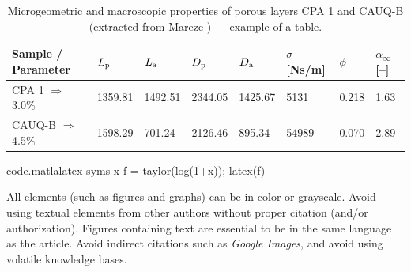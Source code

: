 \begin{table}[!htb]
  \centering {} 
  \caption{Microgeometric and macroscopic properties of porous layers CPA 1 and CAUQ-B\\ (extracted from Mareze \etal \cite{Mareze-2017}) --- example of a table.}
	\fontsize{11}{12}\selectfont 
    \begin{tabular}{C{2.9cm} | C{1.5cm} | C{1.5cm} | C{1.5cm} | C{1.5cm} | C{1.5cm} | C{1.0cm}| C{1.0cm}}
    \toprule
    \textbf{ Sample / Parameter } & $L_{\text{p}}$ \qquad [$\upmu$\! m] & $L_{\text{a}}$ \qquad [$\upmu$\! m] & $D_{\text{p}}$ \qquad [$\upmu$\! m] & $D_{\text{a}}$ \qquad [$\upmu$\! m] & $\sigma$ [Ns/m] & {$\phi$\quad [--]} & $\alpha_{\infty}$ [--]\\
	  \midrule
		CPA 1 $\Rightarrow$  3.0\% &	1359.81 & 1492.51 & 2344.05 & 1425.67 &	5131 &	0.218 &	1.63\\
		 CAUQ-B $\Rightarrow$ 4.5\%	& 1598.29 &	701.24 & 2126.46 & 895.34 &	54989 &	0.070 &	2.89\\
    \bottomrule
    \end{tabular}
    \label{tab.exemplo}%
\end{table}%


\begin{matlabcode}{code.matlalatex}
  syms x
  f = taylor(log(1+x));
  latex(f)
\end{matlabcode}

All elements (such as figures and graphs) can be in color or grayscale. Avoid using textual elements from other authors without proper citation (and/or authorization). Figures containing text are essential to be in the same language as the article. Avoid indirect citations such as \textit{Google Images}, and avoid using volatile knowledge bases.

